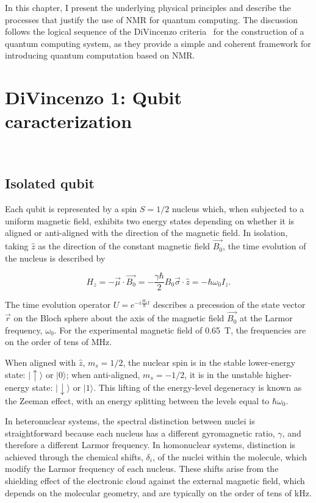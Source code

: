 In this chapter, I present the underlying physical principles and describe the processes that justify the use of NMR for quantum computing. The discussion follows the logical sequence of the DiVincenzo criteria~\cite{DiVincenzo_2000} for the construction of a quantum computing system, as they provide a simple and coherent framework for introducing quantum computation based on NMR.\@

\section{DiVincenzo 1: Qubit caracterization}
~\label{sec:Divincenzo1}

\subsection{Isolated qubit}
\label{subsec:isolated_qubit}

Each qubit is represented by a spin \(S = 1/2\) nucleus which, when subjected to a uniform magnetic field, exhibits two energy states depending on whether it is aligned or anti-aligned with the direction of the magnetic field. In isolation, taking \(\hat{z}\) as the direction of the constant magnetic field \(\vec{B_0}\), the time evolution of the nucleus is described by

\begin{equation}
    H_{z}=-\vec{\mu} \cdot \vec{B_0} = -\frac{\gamma\hbar}{2}B_0 \vec{\sigma}\cdot\hat{z} =-\hbar\omega_0I_z.
    \label{eq:H_z}
\end{equation}

The time evolution operator \(U=e^{-i\frac{H_z}{\hbar}t}\) describes a precession of the state vector \(\vec{r}\) on the Bloch sphere about the axis of the magnetic field \(\vec{B_0}\) at the Larmor frequency, \(\omega_0\). For the experimental magnetic field of \SI{0.65}{\tesla}, the frequencies are on the order of tens of MHz.

When aligned with \(\hat{z}\), \(m_s=1/2\), the nuclear spin is in the stable lower-energy state: \(\lvert\uparrow\rangle\) or \(\lvert0\rangle\); when anti-aligned, \(m_s=-1/2\), it is in the unstable higher-energy state: \(\lvert\downarrow\rangle\) or \(\lvert1\rangle\). This lifting of the energy-level degeneracy is known as the Zeeman effect, with an energy splitting between the levels equal to \(\hbar \omega_0\).

In heteronuclear systems, the spectral distinction between nuclei is straightforward because each nucleus has a different gyromagnetic ratio, \(\gamma\), and therefore a different Larmor frequency. In homonuclear systems, distinction is achieved through the chemical shifts, \(\delta_i\), of the nuclei within the molecule, which modify the Larmor frequency of each nucleus. These shifts arise from the shielding effect of the electronic cloud against the external magnetic field, which depends on the molecular geometry, and are typically on the order of tens of kHz.


